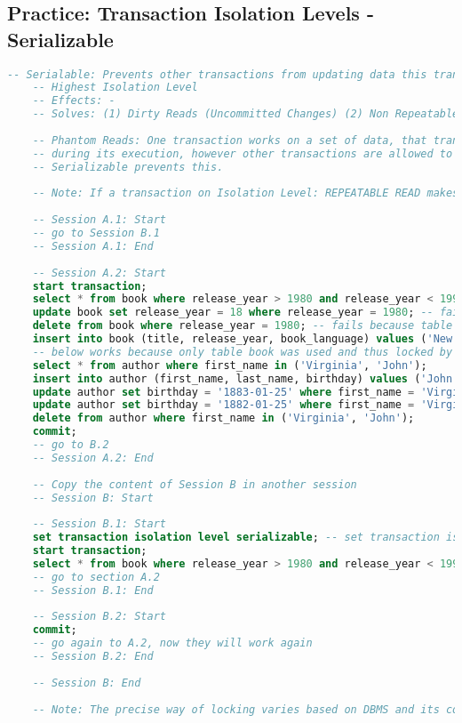 \subsection{Practice: Transaction Isolation Levels - Serializable}
\begin{lstlisting}[language=SQL]
	-- Serialable: Prevents other transactions from updating data this transaction has acquired lock on
	-- Highest Isolation Level
	-- Effects: -
	-- Solves: (1) Dirty Reads (Uncommitted Changes) (2) Non Repeatable Reads (3) Phantom Reads
	
	-- Phantom Reads: One transaction works on a set of data, that transaction keeps seeing exactly same data
	-- during its execution, however other transactions are allowed to change them (insert/delete/update). 
	-- Serializable prevents this.
	
	-- Note: If a transaction on Isolation Level: REPEATABLE READ makes change on some data (for example delete) then another transaction on Isolation Level: Serializable reads these data and then the previous transaction commits the change, the latest transaction still sees inconsistent data.
	
	-- Session A.1: Start
	-- go to Session B.1
	-- Session A.1: End
	
	-- Session A.2: Start
	start transaction;
	select * from book where release_year > 1980 and release_year < 1990; -- works
	update book set release_year = 18 where release_year = 1980; -- fails because table is locked
	delete from book where release_year = 1980; -- fails because table is locked
	insert into book (title, release_year, book_language) values ('New SQL Book', 2004, 'English'); -- fails again
	-- below works because only table book was used and thus locked by the other transaction
	select * from author where first_name in ('Virginia', 'John');
	insert into author (first_name, last_name, birthday) values ('John', 'Wick', '1891-04-14');
	update author set birthday = '1883-01-25' where first_name = 'Virginia' and last_name = 'Wolf';
	update author set birthday = '1882-01-25' where first_name = 'Virginia' and last_name = 'Wolf';
	delete from author where first_name in ('Virginia', 'John');
	commit;
	-- go to B.2
	-- Session A.2: End
	
	-- Copy the content of Session B in another session
	-- Session B: Start
	
	-- Session B.1: Start
	set transaction isolation level serializable; -- set transaction isolation level to serializable
	start transaction;
	select * from book where release_year > 1980 and release_year < 1990; -- works
	-- go to section A.2
	-- Session B.1: End
	
	-- Session B.2: Start
	commit;
	-- go again to A.2, now they will work again
	-- Session B.2: End
	
	-- Session B: End
	
	-- Note: The precise way of locking varies based on DBMS and its configuration.
\end{lstlisting}
